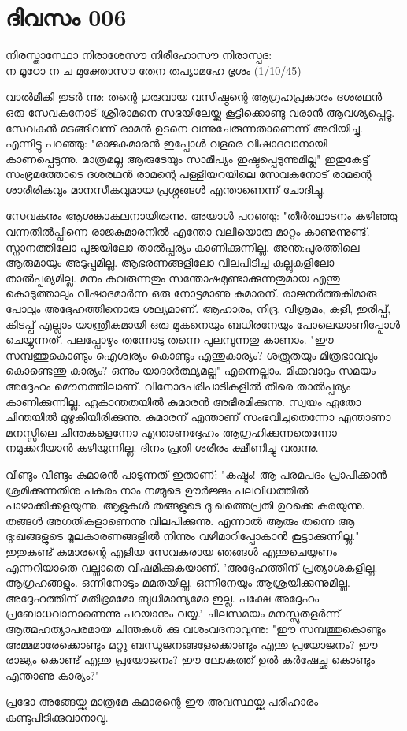 \newpage
\section{ദിവസം 006}

\begin{center}
നിരസ്താസ്ഥോ നിരാശേസൗ നിരീഹോസൗ നിരാസ്പദ:\\
ന മൂഠോ ന ച മുക്തോസൗ തേന തപ്യാമഹേ ഭൃശം (1/10/45)\\
\end{center}

വാല്‍മീകി തുടര്‍ ന്നു: തന്റെ ഗുരുവായ വസിഷ്ഠന്റെ ആഗ്രഹപ്രകാരം ദശരഥന്‍ ഒരു സേവകനോട്‌ ശ്രീരാമനെ സഭയിലേയ്ക്കു കൂട്ടിക്കൊണ്ടു വരാന്‍ ആവശ്യപ്പെട്ടു. സേവകന്‍ മടങ്ങിവന്ന് രാമന്‍ ഉടനെ വന്നുചേരുന്നതാണെന്ന് അറിയിച്ചു. എന്നിട്ടു പറഞ്ഞു: "രാജകുമാരന്‍ ഇപ്പോള്‍ വളരെ വിഷാദവാനായി കാണപ്പെടുന്നു. മാത്രമല്ല ആരുടേയും സാമീപ്യം ഇഷ്ടപ്പെടുന്നുമില്ല" ഇതുകേട്ട്‌ സംഭ്രമത്തോടെ ദശരഥന്‍ രാമന്റെ പള്ളിയറയിലെ സേവകനോട്‌ രാമന്റെ ശാരീരികവും മാനസീകവുമായ പ്രശ്നങ്ങള്‍ എന്താണെന്ന് ചോദിച്ചു. 


സേവകനും ആശങ്കാകുലനായിരുന്നു. അയാള്‍ പറഞ്ഞു: "തീര്‍ത്ഥാടനം കഴിഞ്ഞു വന്നതില്‍പ്പിന്നെ രാജകുമാരനില്‍ എന്തോ വലിയൊരു മാറ്റം കാണുന്നുണ്ട്‌. സ്നാനത്തിലോ പൂജയിലോ താല്‍പ്പര്യം കാണിക്കുന്നില്ല. അന്ത:പുരത്തിലെ ആരുമായും അടുപ്പമില്ല. ആഭരണങ്ങളിലോ വിലപിടിച്ച കല്ലുകളിലോ താല്‍പ്പര്യമില്ല. മനം കവരുന്നതും സന്തോഷമുണ്ടാക്കുന്നതുമായ എന്തു കൊടുത്താലും വിഷാദമാര്‍ന്ന ഒരു നോട്ടമാണു കുമാരന്‌. രാജനര്‍ത്തകിമാരു പോലും അദ്ദേഹത്തിനൊരു ശല്യമാണ്‌. ആഹാരം, നിദ്ര, വിശ്രമം, കുളി, ഇരിപ്പ്‌, കിടപ്പ്‌ എല്ലാം യാന്ത്രീകമായി ഒരു മൂകനെയും ബധിരനേയും പോലെയാണിപ്പോള്‍ ചെയ്യുന്നത്‌. പലപ്പോഴും തന്നോടു തന്നെ പുലമ്പുന്നതു കാണാം. "ഈ സമ്പത്തുകൊണ്ടും ഐശ്വര്യം കൊണ്ടും എന്തുകാര്യം? ശത്രുതയും മിത്രഭാവവും കൊണ്ടെന്തു കാര്യം? ഒന്നും യാദാര്‍ത്ഥ്യമല്ല" എന്നെല്ലാം. മിക്കവാറും സമയം അദ്ദേഹം മൌനത്തിലാണ്‌. വിനോദപരിപാടികളില്‍ തീരെ താല്‍പ്പര്യം കാണിക്കുന്നില്ല. ഏകാന്തതയില്‍ കുമാരന്‍ അഭിരമിക്കുന്നു. സ്വയം ഏതോ ചിന്തയില്‍ മുഴുകിയിരിക്കുന്നു. കുമാരന്‌ എന്താണ്‌ സംഭവിച്ചതെന്നോ എന്താണാ മനസ്സിലെ ചിന്തകളെന്നോ എന്താണദ്ദേഹം ആഗ്രഹിക്കുന്നതെന്നോ നമുക്കറിയാന്‍ കഴിയുന്നില്ല. ദിനം പ്രതി ശരീരം ക്ഷീണിച്ചു വരുന്നു. 

വീണ്ടും വീണ്ടും കുമാരന്‍ പാടുന്നത്‌ ഇതാണ്‌: "കഷ്ടം! ആ പരമപദം പ്രാപിക്കാന്‍ ശ്രമിക്കുന്നതിനു പകരം നാം നമ്മുടെ ഊര്‍ജ്ജം പലവിധത്തില്‍ പാഴാക്കിക്കളയുന്നു. ആളുകള്‍ തങ്ങളുടെ ദു:ഖത്തെപ്രതി ഉറക്കെ കരയുന്നു. തങ്ങള്‍ അഗതികളാണെന്നു വിലപിക്കുന്നു. എന്നാല്‍ ആരും തന്നെ ആ ദു:ഖങ്ങളുടെ മൂലകാരണങ്ങളില്‍ നിന്നും വഴിമാറിപ്പോകാന്‍ കൂട്ടാക്കുന്നില്ല." ഇതുകണ്ട്‌ കുമാരന്റെ എളിയ സേവകരായ ഞങ്ങള്‍ എന്തുചെയ്യണം എന്നറിയാതെ വല്ലാതെ വിഷമിക്കുകയാണ്‌. 'അദ്ദേഹത്തിന്‌ പ്രത്യാശകളില്ല. ആഗ്രഹങ്ങളും. ഒന്നിനോടും മമതയില്ല. ഒന്നിനേയും ആശ്രയിക്കുന്നുമില്ല. അദ്ദേഹത്തിന്‌ മതിഭ്രമമോ ബുധിമാന്ദ്യമോ ഇല്ല. പക്ഷേ അദ്ദേഹം പ്രബോധവാനാണെന്നു പറയാനും വയ്യ.' ചിലസമയം മനസ്സുതളര്‍ന്ന് ആത്മഹത്യാപരമായ ചിന്തകള്‍ ക്കു വശംവദനാവുന്നു: "ഈ സമ്പത്തുകൊണ്ടും അമ്മമാരേക്കൊണ്ടും മറ്റു ബന്ധുജനങ്ങളേക്കൊണ്ടും എന്തു പ്രയോജനം? ഈ രാജ്യം കൊണ്ട്‌ എന്തു പ്രയോജനം? ഈ ലോകത്ത്‌ ഉല്‍ കര്‍ഷേച്ഛ കൊണ്ടും എന്താണു കാര്യം?" 


പ്രഭോ അങ്ങേയ്ക്കു മാത്രമേ കുമാരന്റെ ഈ അവസ്ഥയ്ക്കു പരിഹാരം കണ്ടുപിടിക്കുവാനാവൂ.

